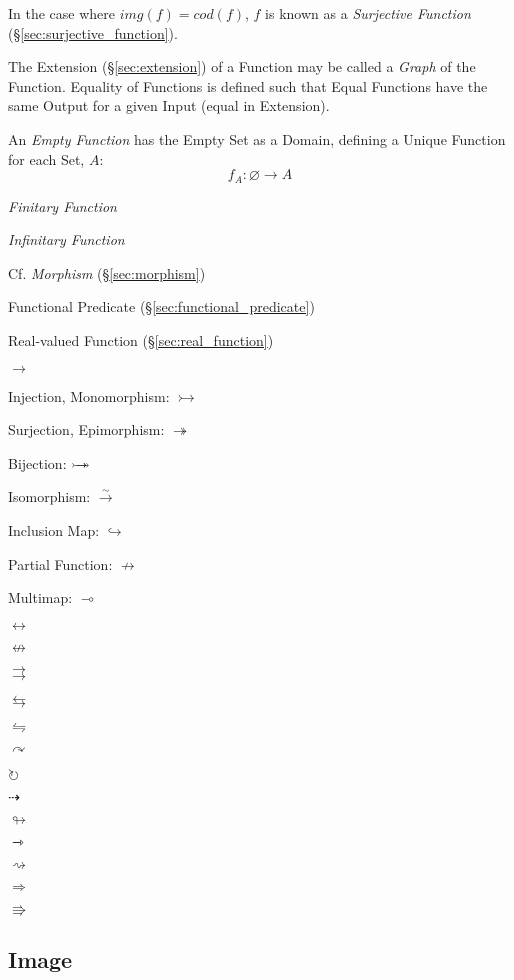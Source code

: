In the case where $img(f) = cod(f)$, $f$ is known as a
\emph{Surjective Function} (\S\ref{sec:surjective_function}).

The Extension (\S\ref{sec:extension}) of a Function may be called a
\emph{Graph} of the Function. Equality of Functions is defined such
that Equal Functions have the same Output for a given Input (equal in
Extension).

An \emph{Empty Function} has the Empty Set as a Domain, defining a
Unique Function for each Set, $A$:
\[
  f_A : \varnothing \rightarrow A
\]

\emph{Finitary Function}

\emph{Infinitary Function}

\fist Cf. \emph{Morphism} (\S\ref{sec:morphism})

Functional Predicate (\S\ref{sec:functional_predicate})

Real-valued Function (\S\ref{sec:real_function})

$\rightarrow$

Injection, Monomorphism: $\rightarrowtail$

Surjection, Epimorphism: $\twoheadrightarrow$

Bijection: $\rightarrowtail \hspace{-8pt} \twoheadrightarrow$

Isomorphism: $\xrightarrow{\sim}$

Inclusion Map: $\hookrightarrow$

Partial Function: $\nrightarrow$

Multimap: $\multimap$

$\leftrightarrow$

$\nleftrightarrow$

$\rightrightarrows$

$\leftrightarrows$

$\leftrightharpoons$

$\curvearrowright$

$\circlearrowright$

$\dashrightarrow$

$\looparrowright$

$\rightarrowtriangle$

$\rightsquigarrow$

$\Rightarrow$

$\Rrightarrow$



\subsection{Image}\label{sec:image}


